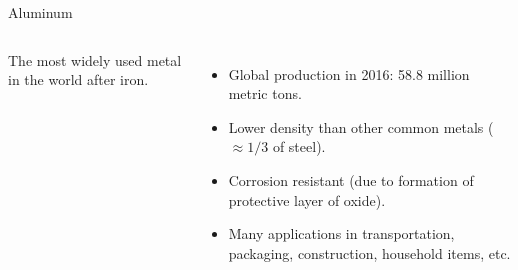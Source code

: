 \documentclass[aspectratio=169]{beamer}
\begin{document}
    \begin{frame}{Aluminum}
        \begin{columns}
            The most widely used metal in the world after iron.
            \begin{itemize}
                \item Global production in 2016: 58.8 million metric tons.
                \item Lower density than other common metals ($\approx 1/3$ of steel).
                \item Corrosion resistant (due to formation of protective layer of oxide).
                \item Many applications in transportation, packaging, construction, household items, etc.
            \end{itemize}


\end{columns}
\end{frame}
\end{document}
